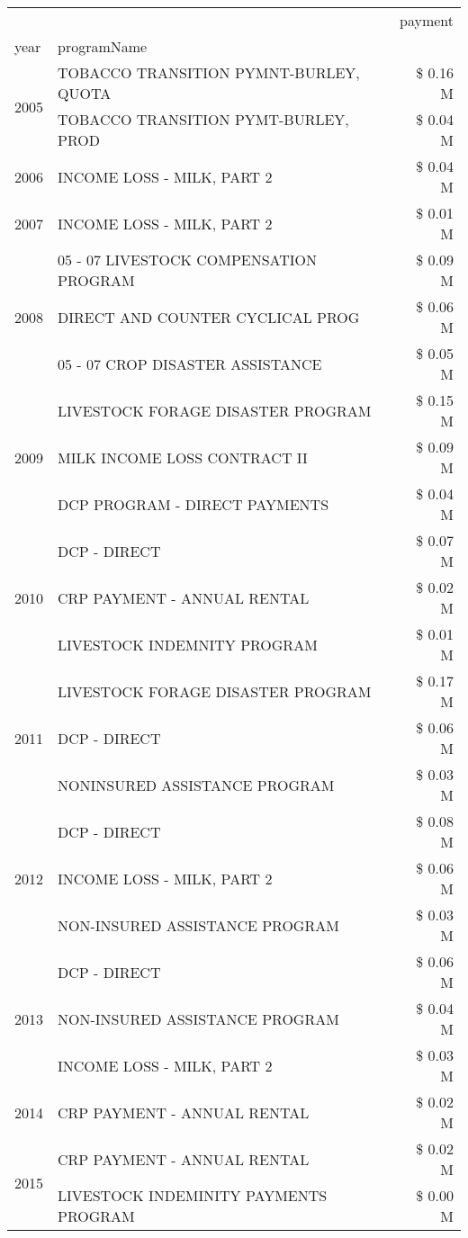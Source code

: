 \begin{tabular}{llr}
\toprule
 &  & payment \\
year & programName &  \\
\midrule
\multirow[t]{2}{*}{2005} & TOBACCO TRANSITION PYMNT-BURLEY, QUOTA & \$ 0.16 M \\
 & TOBACCO TRANSITION PYMT-BURLEY, PROD & \$ 0.04 M \\
\cline{1-3}
2006 & INCOME LOSS - MILK, PART 2 & \$ 0.04 M \\
\cline{1-3}
2007 & INCOME LOSS - MILK, PART 2 & \$ 0.01 M \\
\cline{1-3}
\multirow[t]{3}{*}{2008} & 05 - 07 LIVESTOCK COMPENSATION PROGRAM & \$ 0.09 M \\
 & DIRECT AND COUNTER CYCLICAL PROG & \$ 0.06 M \\
 & 05 - 07 CROP DISASTER ASSISTANCE & \$ 0.05 M \\
\cline{1-3}
\multirow[t]{3}{*}{2009} & LIVESTOCK FORAGE DISASTER  PROGRAM & \$ 0.15 M \\
 & MILK INCOME LOSS CONTRACT II & \$ 0.09 M \\
 & DCP PROGRAM - DIRECT PAYMENTS & \$ 0.04 M \\
\cline{1-3}
\multirow[t]{3}{*}{2010} & DCP - DIRECT & \$ 0.07 M \\
 & CRP PAYMENT - ANNUAL RENTAL & \$ 0.02 M \\
 & LIVESTOCK INDEMNITY PROGRAM & \$ 0.01 M \\
\cline{1-3}
\multirow[t]{3}{*}{2011} & LIVESTOCK FORAGE DISASTER PROGRAM & \$ 0.17 M \\
 & DCP - DIRECT & \$ 0.06 M \\
 & NONINSURED ASSISTANCE PROGRAM & \$ 0.03 M \\
\cline{1-3}
\multirow[t]{3}{*}{2012} & DCP - DIRECT & \$ 0.08 M \\
 & INCOME LOSS - MILK, PART 2 & \$ 0.06 M \\
 & NON-INSURED ASSISTANCE PROGRAM & \$ 0.03 M \\
\cline{1-3}
\multirow[t]{3}{*}{2013} & DCP - DIRECT & \$ 0.06 M \\
 & NON-INSURED ASSISTANCE PROGRAM & \$ 0.04 M \\
 & INCOME LOSS - MILK, PART 2 & \$ 0.03 M \\
\cline{1-3}
2014 & CRP PAYMENT - ANNUAL RENTAL & \$ 0.02 M \\
\cline{1-3}
\multirow[t]{2}{*}{2015} & CRP PAYMENT - ANNUAL RENTAL & \$ 0.02 M \\
 & LIVESTOCK INDEMINITY PAYMENTS PROGRAM & \$ 0.00 M \\

\end{tabular}
